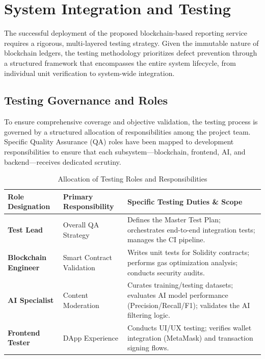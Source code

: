 \section{System Integration and Testing}
\label{sec:system_integration_and_testing}

The successful deployment of the proposed blockchain-based reporting service requires a rigorous, multi-layered testing strategy. Given the immutable nature of blockchain ledgers, the testing methodology prioritizes defect prevention through a structured framework that encompasses the entire system lifecycle, from individual unit verification to system-wide integration.

\subsection{Testing Governance and Roles}
To ensure comprehensive coverage and objective validation, the testing process is governed by a structured allocation of responsibilities among the project team. Specific Quality Assurance (QA) roles have been mapped to development responsibilities to ensure that each subsystem—blockchain, frontend, AI, and backend—receives dedicated scrutiny.

\begin{table}[h!]
\centering
\caption{Allocation of Testing Roles and Responsibilities}
\label{tab:testing_roles}
\begin{tabular}{|l|p{4cm}|p{7cm}|}
\hline
\textbf{Role Designation} & \textbf{Primary Responsibility} & \textbf{Specific Testing Duties \& Scope} \\ \hline
\textbf{Test Lead} & Overall QA Strategy & Defines the Master Test Plan; orchestrates end-to-end integration tests; manages the CI pipeline. \\ \hline
\textbf{Blockchain Engineer} & Smart Contract Validation & Writes unit tests for Solidity contracts; performs gas optimization analysis; conducts security audits. \\ \hline
\textbf{AI Specialist} & Content Moderation & Curates training/testing datasets; evaluates AI model performance (Precision/Recall/F1); validates the AI filtering logic. \\ \hline
\textbf{Frontend Tester} & DApp Experience & Conducts UI/UX testing; verifies wallet integration (MetaMask) and transaction signing flows. \\ \hline
\end{tabular}
\end{table}

